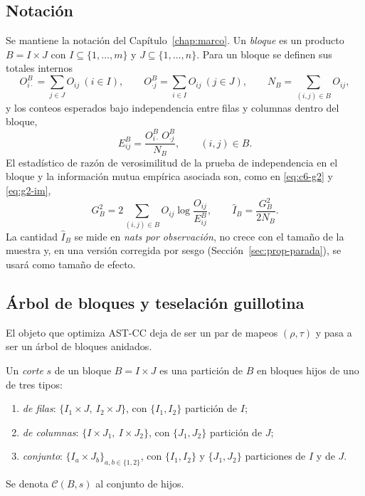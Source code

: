 \subsection{Notación}

Se mantiene la notación del Capítulo~\ref{chap:marco}. Un \emph{bloque} es un
producto $B = I \times J$ con $I \subseteq \{1,\dots,m\}$ y
$J \subseteq \{1,\dots,n\}$. Para un bloque se definen sus totales internos
\[
  O^{B}_{i\cdot} = \sum_{j\in J} O_{ij}\ (i\in I), \qquad
  O^{B}_{\cdot j} = \sum_{i\in I} O_{ij}\ (j\in J), \qquad
  N_B = \sum_{(i,j)\in B} O_{ij},
\]
y los conteos esperados bajo independencia entre filas y columnas dentro del
bloque,
\begin{equation}\label{eq:prop-EB}
  E^{B}_{ij} = \frac{O^{B}_{i\cdot}\, O^{B}_{\cdot j}}{N_B},
  \qquad (i,j)\in B .
\end{equation}
El estadístico de razón de verosimilitud de la prueba de independencia en el
bloque y la información mutua empírica asociada son, como en
\eqref{eq:c6-g2} y \eqref{eq:g2-im},
\begin{equation}\label{eq:prop-G2}
  G^2_B = 2\sum_{(i,j)\in B} O_{ij}\log\frac{O_{ij}}{E^{B}_{ij}},
  \qquad
  \hat I_B = \frac{G^2_B}{2N_B}.
\end{equation}
La cantidad $\hat I_B$ se mide en \emph{nats por observación}, no crece con el
tamaño de la muestra y, en una versión corregida por sesgo
(Sección~\ref{sec:prop-parada}), se usará como tamaño de efecto.

\subsection{Árbol de bloques y teselación guillotina}

El objeto que optimiza AST-CC deja de ser un par de mapeos $(\rho,\tau)$ y pasa
a ser un árbol de bloques anidados.

\begin{definicion}\label{def:corte}
Un \emph{corte} $s$ de un bloque $B = I\times J$ es una partición de $B$ en
bloques hijos de uno de tres tipos:
\begin{enumerate}
  \item \emph{de filas}: $\{I_1\times J,\ I_2\times J\}$, con
  $\{I_1,I_2\}$ partición de $I$;
  \item \emph{de columnas}: $\{I\times J_1,\ I\times J_2\}$, con
  $\{J_1,J_2\}$ partición de $J$;
  \item \emph{conjunto}: $\{I_a\times J_b\}_{a,b\in\{1,2\}}$, con
  $\{I_1,I_2\}$ y $\{J_1,J_2\}$ particiones de $I$ y de $J$.
\end{enumerate}
Se denota $\mathcal{C}(B,s)$ al conjunto de hijos.
\end{definicion}

